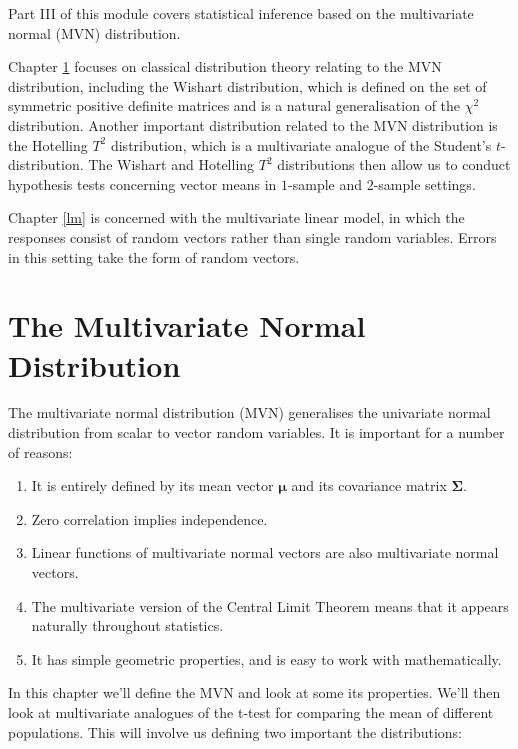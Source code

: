 \documentclass[]{book}
\providecommand{\tightlist}{%
  \setlength{\itemsep}{0pt}\setlength{\parskip}{0pt}}
\theoremstyle{definition}
\theoremstyle{definition}
\theoremstyle{definition}
\theoremstyle{remark}
\begin{document}
Part III of this module covers statistical inference based on the multivariate normal (MVN) distribution.

Chapter \ref{multinormal} focuses on classical distribution theory relating to the MVN distribution, including the Wishart distribution, which is defined on the set of symmetric positive definite matrices and is a natural generalisation of the \(\chi^2\) distribution. Another important distribution related to the MVN distribution is the Hotelling \(T^2\) distribution, which is a multivariate analogue of the Student's \(t\)-distribution.
The Wishart and Hotelling \(T^2\) distributions then allow us to conduct hypothesis tests concerning vector means in \(1\)-sample and \(2\)-sample settings.

Chapter \ref{lm} is concerned with the multivariate linear model, in which the responses consist of random vectors rather than single random variables. Errors in this setting take the form of random vectors.

\hypertarget{multinormal}{%
\chapter{The Multivariate Normal Distribution}\label{multinormal}}

The multivariate normal distribution (MVN) generalises the univariate normal distribution from scalar to vector random variables. It is important for a number of reasons:

\begin{enumerate}
\def\labelenumi{\arabic{enumi}.}
\tightlist
\item
  It is entirely defined by its mean vector \({\boldsymbol{\mu}}\) and its covariance matrix \(\boldsymbol{\Sigma}\).
\item
  Zero correlation implies independence.
\item
  Linear functions of multivariate normal vectors are also multivariate normal vectors.
\item
  The multivariate version of the Central Limit Theorem means that it appears naturally throughout statistics.
\item
  It has simple geometric properties, and is easy to work with mathematically.
\end{enumerate}

In this chapter we'll define the MVN and look at some its properties. We'll then look at multivariate analogues of the t-test for comparing the mean of different populations. This will involve us defining two important the distributions:
\end{document}
